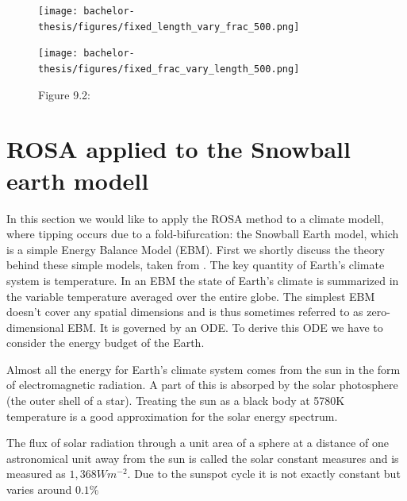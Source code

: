 \documentclass[%
thesis=student,%
coverpage=false,%
titlepage=false,%
headmarks=true, %
german,%
font=libertine, %
math=newpxtx, %
BCOR=5mm,%
coverBCOR=11mm%
]{tumbook}
\begin{document}
\begin{figure}[h!]
    \centering
    \begin{minipage}[t]{0.45\textwidth}
        \centering
        \texttt{[image: bachelor-thesis/figures/fixed\_length\_vary\_frac\_500.png]}
    \end{minipage}
    \hfill
    \begin{minipage}[t]{0.45\textwidth}
        \centering
        \texttt{[image: bachelor-thesis/figures/fixed\_frac\_vary\_length\_500.png]}
    \end{minipage}
    \vspace{0.5cm}
    
    \centering
    \begin{minipage}[b]{0.9\textwidth}
        \centering     
        Figure 9.2: 
    \end{minipage}
    \label{fig:figure 9.2}
\end{figure}


\chapter{ROSA applied to the Snowball earth modell}

In this section we would like to apply the ROSA method to a climate modell, where tipping occurs due to a fold-bifurcation: the Snowball Earth model, which is a simple Energy Balance Model (EBM). First we shortly discuss the theory behind these simple models, taken from \cite{Kaper:2013}. The key quantity of Earth's climate system is temperature. In an EBM the state of Earth's climate is summarized in the variable temperature averaged over the entire globe. The simplest EBM doesn't cover any spatial dimensions and is thus sometimes referred to as zero-dimensional EBM. It is governed by an ODE. To derive this ODE we have to consider the energy budget of the Earth.

Almost all the energy for Earth's climate system comes from the sun in the form of electromagnetic radiation. A part of this is absorped by the solar photosphere (the outer shell of a star). Treating the sun as a black body at 5780K temperature is a good approximation for the solar energy spectrum.

The flux of solar radiation through a unit area of a sphere at a distance of one astronomical unit away from the sun is called the solar constant measures and is measured as $1,368Wm^{-2}$. Due to the sunspot cycle it is not exactly constant but varies around $0.1\%$
\end{document}
